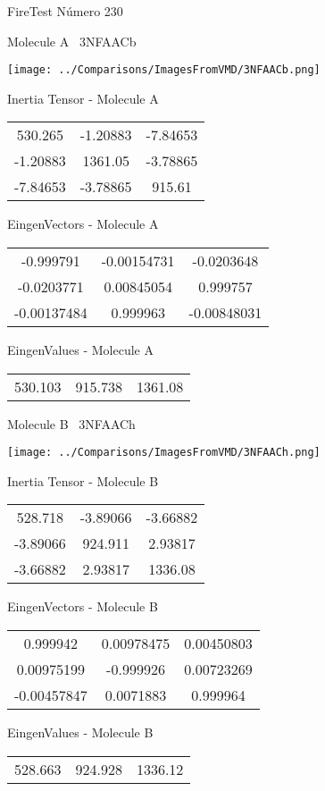 \vtab[-3cm]
\begin{center}
{\large FireTest \tab Número 230}
\end{center}
\begin{multicols}{2}
\begin{center}

Molecule A \
3NFAACb

\texttt{[image: ../Comparisons/ImagesFromVMD/3NFAACb.png]}

Inertia Tensor - Molecule A \\
\begin{tabular}{|c c c|}
530.265	 & 	-1.20883	 & 	-7.84653	 \\
-1.20883	 & 	1361.05	 & 	-3.78865	 \\
-7.84653	 & 	-3.78865	 & 	915.61
\end{tabular}

\vtab
 EingenVectors - Molecule A     \\
\begin{tabular}{|c c c|}
-0.999791	 & 	-0.00154731	 & 	-0.0203648	 \\
-0.0203771	 & 	0.00845054	 & 	0.999757	 \\
-0.00137484	 & 	0.999963	 & 	-0.00848031
\end{tabular}

\vtab
 EingenValues - Molecule A     \\
\begin{tabular}{|c c c|}
530.103	 & 	915.738	 & 	1361.08	 \\
\end{tabular}
\columnbreak

Molecule B \
3NFAACh

\texttt{[image: ../Comparisons/ImagesFromVMD/3NFAACh.png]}

Inertia Tensor - Molecule B \\
\begin{tabular}{|c c c|}
528.718	 & 	-3.89066	 & 	-3.66882	 \\
-3.89066	 & 	924.911	 & 	2.93817	 \\
-3.66882	 & 	2.93817	 & 	1336.08
\end{tabular}

\vtab
 EingenVectors - Molecule B     \\
\begin{tabular}{|c c c|}
0.999942	 & 	0.00978475	 & 	0.00450803	 \\
0.00975199	 & 	-0.999926	 & 	0.00723269	 \\
-0.00457847	 & 	0.0071883	 & 	0.999964
\end{tabular}

\vtab
 EingenValues - Molecule B     \\
\begin{tabular}{|c c c|}
528.663	 & 	924.928	 & 	1336.12	 \\
\end{tabular}

\end{center}
\end{multicols}


